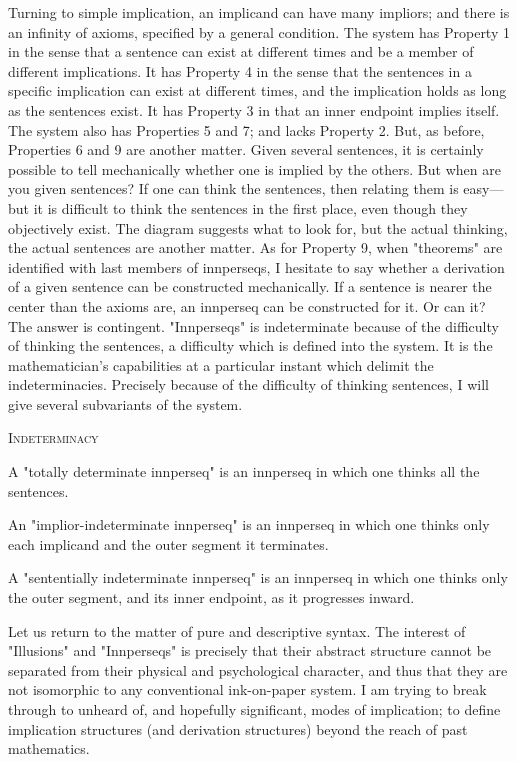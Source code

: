 \documentclass[10pt,twoside]{memoir}
\begin{document}
\begin{enumerate}
{\begin{enumerate}
\begin{sysrules}
\begin{sysrules}
\begin{sysrules}
Turning to simple implication, an implicand can have many impliors; 
and there is an infinity of axioms, specified by a general condition. The 
system has Property 1 in the sense that a sentence can exist at different 
times and be a member of different implications. It has Property 4 in the 
sense that the sentences in a specific implication can exist at different times, 
and the implication holds as long as the sentences exist. It has Property 3 in 
that an inner endpoint implies itself. The system also has Properties 5 and 7; 
and lacks Property 2. But, as before, Properties 6 and 9 are another matter. 
Given several sentences, it is certainly possible to tell mechanically whether 
one is implied by the others. But when are you given sentences? If one can 
think the sentences, then relating them is easy---but it is difficult to think the 
sentences in the first place, even though they objectively exist. The diagram 
suggests what to look for, but the actual thinking, the actual sentences are 
another matter. As for Property 9, when "theorems" are identified with last 
members of innperseqs, I hesitate to say whether a derivation of a given 
sentence can be constructed mechanically. If a sentence is nearer the center 
than the axioms are, an innperseq can be constructed for it. Or can it? The 
answer is contingent. "Innperseqs" is indeterminate because of the difficulty 
of thinking the sentences, a difficulty which is defined into the system. It is 
the mathematician's capabilities at a particular instant which delimit the 
indeterminacies. Precisely because of the difficulty of thinking sentences, I 
will give several subvariants of the system. 


{ \centering \large \textsc{Indeterminacy} \par}
\begin{sysrules}
A "totally determinate innperseq" is an innperseq in which one thinks all the 
sentences. 

An "implior-indeterminate innperseq" is an innperseq in which one thinks 
only each implicand and the outer segment it terminates. 

A "sententially indeterminate innperseq" is an innperseq in which one thinks 
only the outer segment, and its inner endpoint, as it progresses 
inward. 
\end{sysrules}


Let us return to the matter of pure and descriptive syntax. The interest 
of "Illusions" and "Innperseqs" is precisely that their abstract structure 
cannot be separated from their physical and psychological character, and 
thus that they are not isomorphic to any conventional ink-on-paper system. I 
am trying to break through to unheard of, and hopefully significant, modes 
of implication; to define implication structures (and derivation structures) 
beyond the reach of past mathematics. 


\end{sysrules}
\end{sysrules}
\end{sysrules}
\end{enumerate}}
\end{enumerate}
\end{document}
